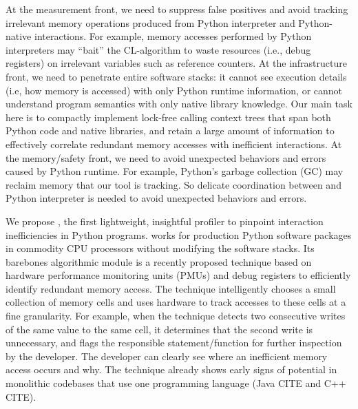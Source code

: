 
At the measurement front, we need to suppress false positives and avoid tracking irrelevant memory operations produced from Python interpreter and Python-native interactions. For example, memory accesses performed by Python interpreters may ``bait'' the CL-algorithm to waste resources (i.e., debug registers) on irrelevant variables such as reference counters. At the infrastructure front, we need to penetrate entire software stacks: it cannot see execution details (i.e, how memory is accessed) with only Python runtime information, or cannot understand program semantics with only native library knowledge. Our main task here is to compactly implement lock-free calling context trees that span both Python code and native libraries, and retain a large amount of information to effectively correlate redundant memory accesses with inefficient interactions. At the memory/safety front, we need to avoid unexpected behaviors and errors caused by Python runtime. For example, Python’s garbage collection (GC) may
reclaim memory that our tool is tracking. So delicate coordination between \tool and Python interpreter is needed to avoid unexpected behaviors and errors. 




\iffalse
We propose \tool, the first lightweight, insightful profiler to pinpoint interaction inefficiencies in Python programs. \tool works for production Python software packages in commodity CPU processors without modifying the software stacks. Its barebones algorithmic module is a recently proposed technique based on hardware performance monitoring units (PMUs) and debug registers to efficiently identify redundant memory access. The technique intelligently chooses a small collection of memory cells and uses hardware to track accesses to these cells at a fine granularity. For example, when the technique detects two consecutive writes of the same value to the same cell, it determines that the second write is unnecessary, and flags the responsible statement/function for further inspection by the developer. The developer can clearly see where an inefficient memory access occurs and why.  The technique already shows early signs of potential in monolithic codebases that use one programming language (Java CITE and C++ CITE). 

